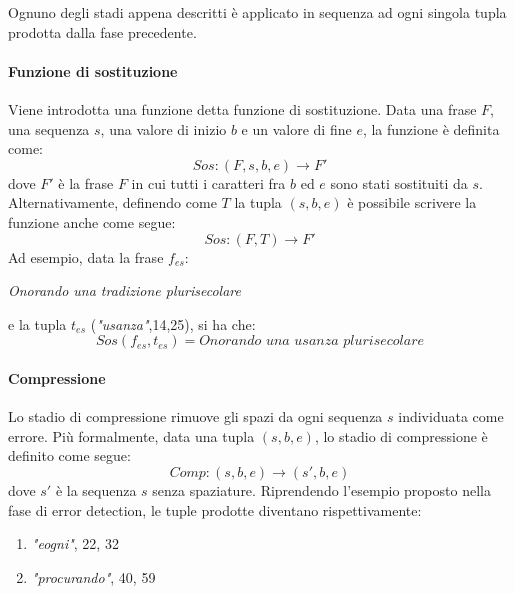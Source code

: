 Ognuno degli stadi appena descritti è applicato in sequenza ad ogni singola tupla prodotta dalla fase precedente.

\paragraph{Funzione di sostituzione}
Viene introdotta una funzione detta funzione di sostituzione. Data una frase $F$, una sequenza $s$, una valore di inizio $b$ e un valore di fine $e$, la funzione è definita come:
\begin{equation}
\textit{Sos}: (F,s,b,e) \rightarrow F\prime
\end{equation}
dove $F\prime$ è la frase $F$ in cui tutti i caratteri fra $b$ ed $e$ sono stati sostituiti da $s$.\\
Alternativamente, definendo come $T$ la tupla $(s,b,e)$ è possibile scrivere la funzione anche come segue:
\begin{equation}
\textit{Sos}: (F,T) \rightarrow F\prime
\end{equation}
Ad esempio, data la frase $f_{es}$:
\begin{center}
\textit{Onorando una tradizione plurisecolare}
\end{center}
e la tupla $t_{es}$ (\textit{"usanza"},14,25), si ha che:
\begin{equation}
\textit{Sos}(f_{es},t_{es}) = \textit{Onorando una usanza plurisecolare}
\end{equation}


\paragraph{Compressione}
Lo stadio di compressione rimuove gli spazi da ogni sequenza $s$ individuata come errore. Più formalmente, data una tupla $(s,b,e)$, lo stadio di compressione è definito come segue:
\begin{equation}
\textit{Comp}: (s,b,e) \rightarrow (s\prime,b,e)
\end{equation}
dove $s\prime$ è la sequenza $s$ senza spaziature. Riprendendo l'esempio proposto nella fase di error detection, le tuple prodotte diventano rispettivamente:
\begin{enumerate}
\item \textit{"eogni"}, 22, 32
\item \textit{"procurando"}, 40, 59
\end{enumerate}

